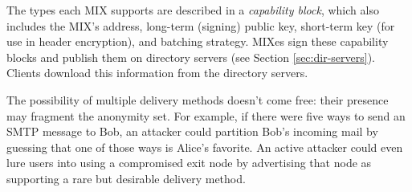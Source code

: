 \documentclass{llncs}
\begin{document}
%
%

The types each MIX supports are described in a \emph{capability block},
which also includes the MIX's address, long-term (signing) public key,
short-term key (for use in header encryption), and batching strategy.
MIXes sign these capability blocks
and publish them on directory servers (see Section \ref{sec:dir-servers}).
Clients download this information from the directory servers.

%

The possibility of multiple delivery methods doesn't come free: their
presence may fragment the anonymity set.  For example, if there were five
ways to send an SMTP message to Bob, an attacker could partition Bob's
incoming mail by guessing that one of those ways is Alice's favorite.
An active attacker could even lure users into using a compromised
exit node by advertising that node as supporting a
rare but desirable delivery method.
\end{document}
